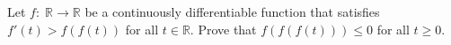 Let \(f\colon \;\mathbb{R}\to\mathbb{R}\) be a continuously differentiable function that satisfies \(f'(t)>f(f(t))\) for all \(t\in\mathbb{R}\). Prove that \(f(f(f(t)))\le0\) for all \(t\ge0\).

